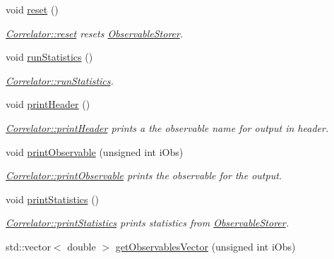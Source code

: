 \begin{DoxyCompactItemize}
void \mbox{\hyperlink{class_lattice_action_charge_density_aebbc2cc72334e7b33d9cce2ad469280b}{reset}} ()
\begin{DoxyCompactList}\small\item\em \mbox{\hyperlink{class_correlator_aacca40262d2cd62f0a3964e832f948c1}{Correlator\+::reset}} resets \mbox{\hyperlink{class_observable_storer}{Observable\+Storer}}. \end{DoxyCompactList}\item 
void \mbox{\hyperlink{class_lattice_action_charge_density_a21d608703811d2814e7f654588eaa0c0}{run\+Statistics}} ()
\begin{DoxyCompactList}\small\item\em \mbox{\hyperlink{class_correlator_a35197b1d12b62ef30b79c0138a26456e}{Correlator\+::run\+Statistics}}. \end{DoxyCompactList}\item 
void \mbox{\hyperlink{class_lattice_action_charge_density_a2a7a806862f23975161316a37f47f22e}{print\+Header}} ()
\begin{DoxyCompactList}\small\item\em \mbox{\hyperlink{class_correlator_ac7c5a07d7cbee97c417a1659b93083b2}{Correlator\+::print\+Header}} prints a the observable name for output in header. \end{DoxyCompactList}\item 
void \mbox{\hyperlink{class_lattice_action_charge_density_abb7db718d4069faab0ed19f31aa85ad4}{print\+Observable}} (unsigned int i\+Obs)
\begin{DoxyCompactList}\small\item\em \mbox{\hyperlink{class_correlator_a15744ddb9f2b71fff34ac762d101df38}{Correlator\+::print\+Observable}} prints the observable for the output. \end{DoxyCompactList}\item 
void \mbox{\hyperlink{class_lattice_action_charge_density_abdaa497dd70dee58b810de7315241a56}{print\+Statistics}} ()
\begin{DoxyCompactList}\small\item\em \mbox{\hyperlink{class_correlator_a2168d677f547769784781d2e2aaa53cf}{Correlator\+::print\+Statistics}} prints statistics from \mbox{\hyperlink{class_observable_storer}{Observable\+Storer}}. \end{DoxyCompactList}\item 
std\+::vector$<$ double $>$ \mbox{\hyperlink{class_lattice_action_charge_density_a72952fbe5ade96d53196d6c2c93896e5}{get\+Observables\+Vector}} (unsigned int i\+Obs)

\end{DoxyCompactItemize}
